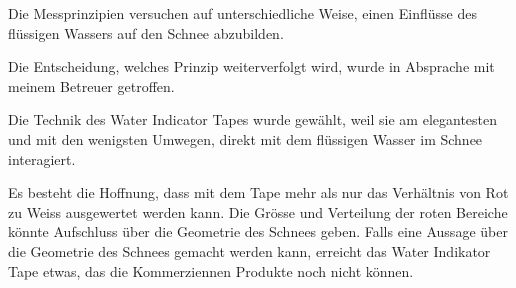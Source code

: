 Die Messprinzipien versuchen auf unterschiedliche Weise, einen Einflüsse des flüssigen Wassers auf den Schnee abzubilden.

Die Entscheidung, welches Prinzip weiterverfolgt wird, wurde in Absprache mit meinem Betreuer getroffen.

Die Technik des Water Indicator Tapes wurde gewählt, weil sie am elegantesten und mit den wenigsten Umwegen, direkt mit dem flüssigen Wasser im Schnee interagiert.

Es besteht die Hoffnung, dass mit dem Tape mehr als nur das Verhältnis von Rot zu Weiss ausgewertet werden kann. Die Grösse und Verteilung der roten Bereiche könnte Aufschluss über die Geometrie des Schnees geben. Falls eine Aussage über die Geometrie des Schnees gemacht werden kann, erreicht das Water Indikator Tape etwas, das die Kommerziennen Produkte noch nicht können.
